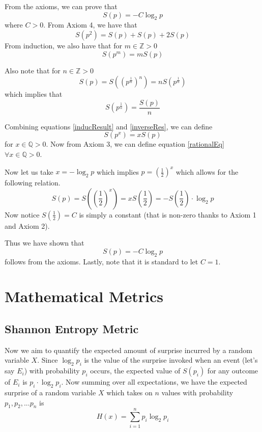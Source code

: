 \documentclass{article}
\begin{document}
\bigskip

From the axioms, we can prove that
\[
S(p) = -C\log_2 p
\]
where $C > 0$.
From Axiom 4, we have that 
\[
S(p^2)=S(p)+S(p)+2S(p)
\]
From induction, we also have that for $m\in \mathbb{Z} > 0$
\begin{equation} \label{inducResult}
    S(p^m)=mS(p)
\end{equation}

Also note that for $n\in \mathbb{Z} > 0$
\[
S(p) = S\left((p^\frac{1}{n})^n\right) = nS(p^\frac{1}{n})
\]
which implies that
\begin{equation} \label{inverseRes}
    S(p^\frac{1}{n}) = \frac{S(p)}{n}
\end{equation}

Combining equations \ref{inducResult} and \ref{inverseRes}, we can define
\begin{equation} \label{rationalEq}
    S(p^x)=xS(p)
\end{equation}
for $x \in \mathbb{Q} >0$. Now from Axiom 3, we can define equation \ref{rationalEq} $\forall x \in\mathbb{Q} >0$.

Now let us take $x=-\log_2 p$ which implies $p=\left(\frac{1}{2}\right)^x$ which allows for the following relation.
\[
S(p) = S\left((\frac{1}{2})^x\right) = xS\left(\frac{1}{2}\right) = -S\left(\frac{1}{2}\right)\cdot\log_2 p
\]
Now notice $S\left(\frac{1}{2}\right) = C$ is simply a constant (that is non-zero thanks to Axiom 1 and Axiom 2).

Thus we have shown that
\begin{equation}
    S(p) = -C\log_2 p
\end{equation}
follows from the axioms.
Lastly, note that it is standard to let $C=1$.


\section{Mathematical Metrics}
\subsection{Shannon Entropy Metric}
Now we aim to quantify the expected amount of surprise incurred by a random variable $X$. Since $\log_2 p_i$ is the value of the surprise invoked when an event (let's say $E_i$) with probability $p_i$ occurs, the expected value of $S(p_i)$ for any outcome of $E_i$ is $p_i \cdot \log_2p_i$.
Now summing over all expectations, we have the expected surprise of a random variable $X$ which takes on $n$ values with probability $p_1,p_2,...p_n$ is
\[
H(x) = \sum_{i=1}^n p_i\log_2p_i
\]
\end{document}

